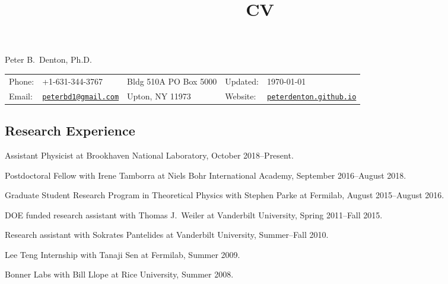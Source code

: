 \documentclass{article}
\title{CV}
\newif\ifhtlatex
\def\name{Peter B.~Denton, Ph.D.}
\renewenvironment{itemize}{
\begin{list}{}{
\setlength{\leftmargin}{.5em}}}{
\end{list}}
\begin{document}
\ifhtlatex
\Tag{TITLE+}{CV}
\fi


{\huge \name}\\
\vspace{0.1in}
\begin{tabular}{ll|l|ll}
Phone: & +1-631-344-3767 & Bldg 510A PO Box 5000 & Updated: & \today\\
Email: & \href{mailto:peterbd1@gmail.com}{\tt peterbd1@gmail.com} & Upton, NY 11973 & Website: & 
\href{http://peterdenton.github.io}{\tt peterdenton.github.io}
\end{tabular}

\subsection*{Research Experience}
\begin{itemize}
\item Assistant Physicist at Brookhaven National Laboratory, October 2018--Present.
\item Postdoctoral Fellow with Irene Tamborra at Niels Bohr International Academy, September 2016--August 2018.
\item Graduate Student Research Program in Theoretical Physics with Stephen Parke at Fermilab, August 2015--August 2016.
\item DOE funded research assistant with Thomas J.~Weiler at Vanderbilt University, Spring 2011--Fall 2015.
\item Research assistant with Sokrates Pantelides at Vanderbilt University, Summer--Fall 2010.
\item Lee Teng Internship with Tanaji Sen at Fermilab, Summer 2009.
\item Bonner Labs with Bill Llope at Rice University, Summer 2008.
\end{itemize}
\end{document}
